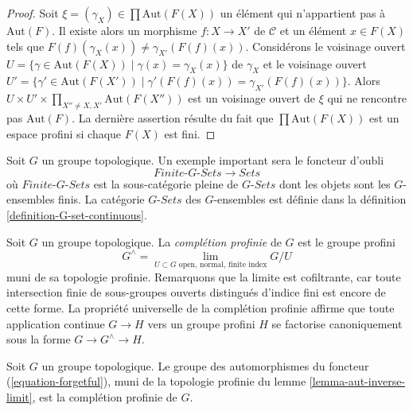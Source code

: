 \begin{proof}
Soit $\xi = (\gamma_X) \in \prod \text{Aut}(F(X))$ un élément qui
n'appartient pas à $\text{Aut}(F)$. Il existe alors un morphisme
$f : X \to X'$ de $\mathcal{C}$ et un élément $x \in F(X)$ tels que
$F(f)(\gamma_X(x)) \not = \gamma_{X'}(F(f)(x))$.
Considérons le voisinage ouvert
$U = \{\gamma \in \text{Aut}(F(X)) \mid \gamma(x) = \gamma_X(x)\}$
de $\gamma_X$ et le voisinage ouvert
$U' = \{\gamma' \in \text{Aut}(F(X')) \mid \gamma'(F(f)(x)) =
\gamma_{X'}(F(f)(x))\}$.
Alors
$U \times U' \times \prod_{X'' \not = X, X'} \text{Aut}(F(X''))$
est un voisinage ouvert de $\xi$ qui ne rencontre pas $\text{Aut}(F)$.
La dernière assertion résulte du fait que
$\prod \text{Aut}(F(X))$ est un espace profini si chaque $F(X)$ est fini.
\end{proof}

\begin{example}
\label{example-galois-category-G-sets}
Soit $G$ un groupe topologique. Un exemple important sera le foncteur d'oubli
\begin{equation}
\label{equation-forgetful}
\textit{Finite-}G\textit{-Sets} \longrightarrow \textit{Sets}
\end{equation}
où $\textit{Finite-}G\textit{-Sets}$ est la sous-catégorie pleine de
$G\textit{-Sets}$ dont les objets sont les $G$-ensembles finis.
La catégorie $G\textit{-Sets}$ des $G$-ensembles est définie dans la
définition \ref{definition-G-set-continuous}.
\end{example}

\noindent
Soit $G$ un groupe topologique. La {\it complétion profinie} de $G$ est le
groupe profini
$$
G^\wedge =
\lim_{U \subset G\text{ open, normal, finite index}} G/U
$$
muni de sa topologie profinie. Remarquons que la limite est cofiltrante,
car toute intersection finie de sous-groupes ouverts distingués d'indice fini
est encore de cette forme. La propriété universelle de la complétion profinie
affirme que toute application continue $G \to H$ vers un groupe profini $H$
se factorise canoniquement sous la forme $G \to G^\wedge \to H$.

\begin{lemma}
\label{lemma-single-out-profinite}
Soit $G$ un groupe topologique. Le groupe des automorphismes du foncteur
(\ref{equation-forgetful}), muni de la topologie profinie du lemme
\ref{lemma-aut-inverse-limit}, est la complétion profinie de $G$.
\end{lemma}

